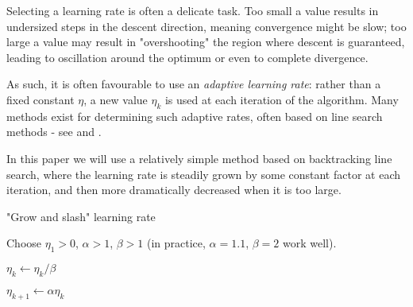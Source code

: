 \documentclass{article}[11pt]
\begin{document}
            Selecting a learning rate is often a delicate task. Too small a value results in undersized steps in the descent direction, meaning convergence might be slow; too large a value may result in "overshooting" the region where descent is guaranteed, leading to oscillation around the optimum or even to complete divergence.
            
            As such, it is often favourable to use an \textit{adaptive learning rate}: rather than a fixed constant $\eta$, a new value $\eta_k$ is used at each iteration of the algorithm. Many methods exist for determining such adaptive rates, often based on line search methods - see \cite{line_search} and \cite{adam}.
            
            In this paper we will use a relatively simple method based on backtracking line search, where the learning rate is steadily grown by some constant factor at each iteration, and then more dramatically decreased when it is too large.
            
            
            \begin{algorithm} \label{alg:grow_and_slash}
                
                \caption{"Grow and slash" learning rate}
                
                \begin{algorithmic}
                
                    \State Choose $\eta_1 > 0$, $\alpha > 1$, $\beta > 1$ (in practice, $\alpha = 1.1$, $\beta = 2$ work well).
                    
                            \State $\eta_k \gets \eta_k / \beta$
                        \EndWhile
                        
                        \State $\eta_{k+1} \gets \alpha \eta_k$
                    \EndFor
                    
                \end{algorithmic}
            
            \end{algorithm}
                    
                
            
            
        
\end{document}
